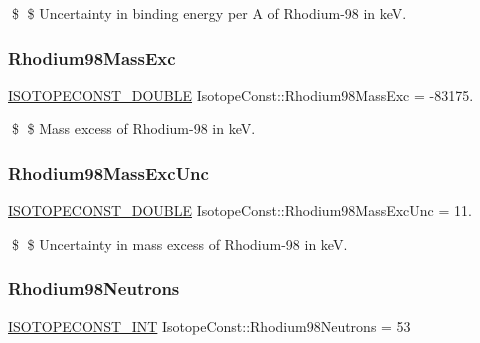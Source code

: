 \$ \$ Uncertainty in binding energy per A of Rhodium-\/98 in keV. \mbox{\label{group___isotope_const-_rhodium-_rh98_gadc109d819559a8d07ed4f253f0281bc4}} 
\subsubsection{\texorpdfstring{Rhodium98\+Mass\+Exc}{Rhodium98MassExc}}
{\footnotesize\ttfamily \mbox{\hyperlink{group___isotope_const-_macros_ga8f45a7272ce02c0b4c65c44636ed719a}{I\+S\+O\+T\+O\+P\+E\+C\+O\+N\+S\+T\+\_\+\+D\+O\+U\+B\+LE}} Isotope\+Const\+::\+Rhodium98\+Mass\+Exc = -\/83175.}

\$ \$ Mass excess of Rhodium-\/98 in keV. \mbox{\label{group___isotope_const-_rhodium-_rh98_ga977e83362c2a12dd26d34c378232486b}} 
\subsubsection{\texorpdfstring{Rhodium98\+Mass\+Exc\+Unc}{Rhodium98MassExcUnc}}
{\footnotesize\ttfamily \mbox{\hyperlink{group___isotope_const-_macros_ga8f45a7272ce02c0b4c65c44636ed719a}{I\+S\+O\+T\+O\+P\+E\+C\+O\+N\+S\+T\+\_\+\+D\+O\+U\+B\+LE}} Isotope\+Const\+::\+Rhodium98\+Mass\+Exc\+Unc = 11.}

\$ \$ Uncertainty in mass excess of Rhodium-\/98 in keV. \mbox{\label{group___isotope_const-_rhodium-_rh98_ga07e2a1674800ac6a2a9487ee4b880a03}} 
\subsubsection{\texorpdfstring{Rhodium98\+Neutrons}{Rhodium98Neutrons}}
{\footnotesize\ttfamily \mbox{\hyperlink{group___isotope_const-_macros_ga5f18360b3e99483a35c32d789e62621c}{I\+S\+O\+T\+O\+P\+E\+C\+O\+N\+S\+T\+\_\+\+I\+NT}} Isotope\+Const\+::\+Rhodium98\+Neutrons = 53}

